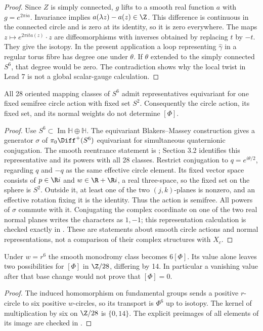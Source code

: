 \begin{proof}
Since $Z$ is simply connected, $g$ lifts to a smooth real function
$a$ with $g=e^{2\pi ia}$. Invariance implies
$a(\lambda z)-a(z)\in\Z$. This difference is continuous in the
connected circle and is zero at its identity, so it is zero
everywhere. The maps $z\mapsto e^{2\pi ita(z)}\cdot z$ are
diffeomorphisms with inverses obtained by replacing $t$ by $-t$.
They give the isotopy. In the present application a loop representing
$\widehat\gamma$ in a regular torus fibre has degree one under
$\theta$. If $\theta$ extended to the simply connected $S^6$,
that degree would be zero. The contradiction shows why the local
twist in Lead 7 is not a global scalar-gauge calculation.
\end{proof}

\begin{proposition}
All 28 oriented mapping classes of $S^6$ admit representatives
equivariant for one fixed semifree circle action with fixed set $S^2$.
Consequently the circle action, its fixed set, and its normal weights
do not determine $[\Phi]$.
\end{proposition}

\begin{proof}
Use $S^6\subset\operatorname{Im}\mathbb H\oplus\mathbb H$.
The equivariant Blakers--Massey construction gives a generator
$\sigma$ of $\pi_0\Diff^+(S^6)$ equivariant for simultaneous
quaternionic conjugation. The smooth reentrance statement is
\citet[Theorem 2.1]{DuranRigas2007}; Section 3.2 identifies this
representative and its powers with all 28 classes. Restrict
conjugation to $q=e^{i\theta/2}$, regarding $q$ and $-q$ as the
same effective circle element. Its fixed vector space consists of
$p\in\R i$ and $w\in\R+\R i$, a real three-space, so the
fixed set on the sphere is $S^2$. Outside it, at least one of the
two $(j,k)$-planes is nonzero, and an effective rotation fixing it
is the identity. Thus the action is semifree. All powers of
$\sigma$ commute with it. Conjugating the complex coordinate on
one of the two real normal planes writes the characters as
$1,-1$; this representation calculation is checked exactly in
. These are statements about smooth circle
actions and normal representations, not a comparison of their
complex structures with $X_c$.
\end{proof}

\begin{proposition}
Under $w=r^6$ the smooth monodromy class becomes $6[\Phi]$.
Its value alone leaves two possibilities for $[\Phi]$ in $\Z/28$,
differing by 14. In particular a vanishing value after that base
change would not prove that $[\Phi]=0$.
\end{proposition}
\begin{proof}
The induced homomorphism on fundamental groups sends a positive
$r$-circle to six positive $w$-circles, so its transport is
$\Phi^6$ up to isotopy. The kernel of multiplication by six on
$\Z/28$ is $\{0,14\}$. The explicit preimages of all elements
of its image are checked in .
\end{proof}

